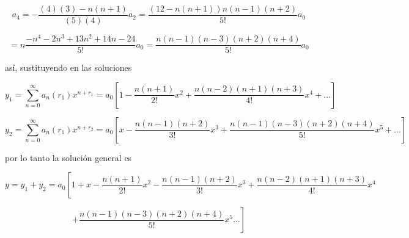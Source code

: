 \documentclass[12pt,a4paper]{article}
\begin{document}
\begin{enumerate}
     \begin{equation*}
         a_4 = -\frac{(4)(3)-n(n+1)}{(5)(4)}a_2 = \frac{(12-n(n+1))n(n-1)(n+2)}{5!}a_0 
     \end{equation*}
     
     \begin{equation*}
         = n\frac{-n^4-2n^3+13n^2+14n-24}{5!}a_0 = \frac{n(n-1)(n-3)(n+2)(n+4)}{5!} a_0
     \end{equation*}
     
     
     así, sustituyendo en las soluciones
     
     \begin{equation*}
         y_1 = \sum_{n= 0}^{\infty} a_n(r_1) x^{n+r_1} = a_0 \left[1 - \frac{n(n+1)}{2!}x^2 + \frac{n(n-2)(n+1)(n+3)}{4!} x^4 + ... \right]
     \end{equation*}
     
     \begin{equation*}
         y_2 = \sum_{n= 0}^{\infty} a_n(r_1) x^{n+r_2} = a_0 \left[x - \frac{n(n-1)(n+2)}{3!} x^3 + \frac{n(n-1)(n-3)(n+2)(n+4)}{5!}x^5 + ... \right]
     \end{equation*}
     
     por lo tanto la solución general es
     
     \begin{equation*}
         y = y_1 +y_2 = a_0 \left[1+x - \frac{n(n+1)}{2!}x^2- \frac{n(n-1)(n+2)}{3!} x^3 + \frac{n(n-2)(n+1)(n+3)}{4!} x^4 \right.
     \end{equation*}
     
     \begin{equation*}
         \left.+ \frac{n(n-1)(n-3)(n+2)(n+4)}{5!}x^5 ... \right]
     \end{equation*}




\end{enumerate}
\end{document}
